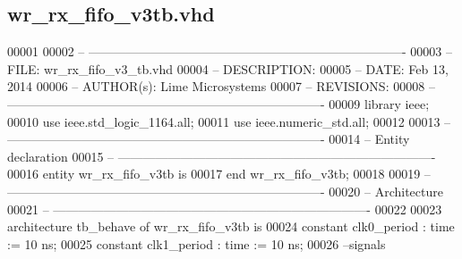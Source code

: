 \subsection{wr\+\_\+rx\+\_\+fifo\+\_\+v3tb.\+vhd}
\label{wr__rx__fifo__v3tb_8vhd_source}

\begin{DoxyCode}
00001 
00002 \textcolor{keyword}{-- ---------------------------------------------------------------------------- }
00003 \textcolor{keyword}{-- FILE:    wr\_rx\_fifo\_v3\_tb.vhd}
00004 \textcolor{keyword}{-- DESCRIPTION: }
00005 \textcolor{keyword}{-- DATE:    Feb 13, 2014}
00006 \textcolor{keyword}{-- AUTHOR(s):   Lime Microsystems}
00007 \textcolor{keyword}{-- REVISIONS:}
00008 \textcolor{keyword}{-- ---------------------------------------------------------------------------- }
00009 \textcolor{vhdlkeyword}{library }\textcolor{keywordflow}{ieee};
00010 \textcolor{vhdlkeyword}{use }ieee.std\_logic\_1164.\textcolor{keywordflow}{all};
00011 \textcolor{vhdlkeyword}{use }ieee.numeric\_std.\textcolor{keywordflow}{all};
00012 
00013 \textcolor{keyword}{-- ----------------------------------------------------------------------------}
00014 \textcolor{keyword}{-- Entity declaration}
00015 \textcolor{keyword}{-- ----------------------------------------------------------------------------}
00016 \textcolor{keywordflow}{entity }wr_rx_fifo_v3tb \textcolor{keywordflow}{is}
00017 \textcolor{keywordflow}{end} \textcolor{vhdlchar}{wr\_rx\_fifo\_v3tb};
00018 
00019 \textcolor{keyword}{-- ----------------------------------------------------------------------------}
00020 \textcolor{keyword}{-- Architecture}
00021 \textcolor{keyword}{-- ----------------------------------------------------------------------------}
00022 
00023 \textcolor{keywordflow}{architecture} tb\_behave \textcolor{keywordflow}{of} wr_rx_fifo_v3tb is
00024     \textcolor{keywordflow}{constant} \textcolor{vhdlchar}{clk0_period}   \textcolor{vhdlchar}{:} \textcolor{comment}{time} \textcolor{vhdlchar}{:=} \textcolor{vhdllogic}{}\textcolor{vhdllogic}{10} \textcolor{vhdlchar}{ns};
00025     \textcolor{keywordflow}{constant} \textcolor{vhdlchar}{clk1_period}   \textcolor{vhdlchar}{:} \textcolor{comment}{time} \textcolor{vhdlchar}{:=} \textcolor{vhdllogic}{}\textcolor{vhdllogic}{10} \textcolor{vhdlchar}{ns}; 
00026 \textcolor{keyword}{  --signals}

\end{DoxyCode}
